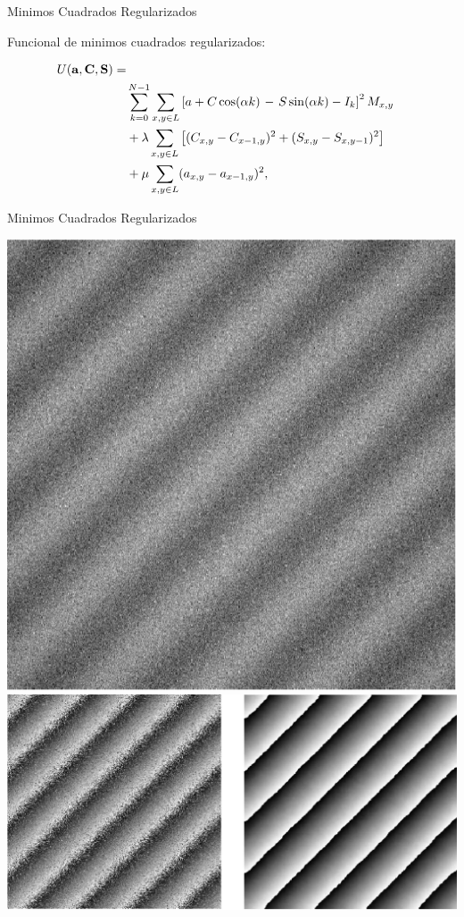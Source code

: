 \documentclass[]{beamer}
\begin{document}
\begin{frame}{Minimos Cuadrados Regularizados}
\begin{center}

Funcional de minimos cuadrados regularizados:
\begin{small}
\begin{align}
  U(\bf{a,C,S})=\nonumber\\
  &\sum_{k=0}^{N-1} \sum_{x,y\in L} \left[a + 
  C\cos(\alpha k)\right.
  -\left. S\sin(\alpha k)-I_k \right]^2 M_{x,y}\nonumber \\
  &+\lambda\sum_{x,y\in L}
  \left[(C_{x,y}-C_{x-1,y})^2+(S_{x,y}-S_{x,y-1})^2\right]
  \nonumber\\
  &+\mu\sum_{x,y\in L}(a_{x,y}-a_{x-1,y})^2,
  \label{eq:psi regularized}
\end{align}
\end{small}


\end{center}
\end{frame}
\begin{frame}{Minimos Cuadrados Regularizados}
\begin{center}

\includegraphics[scale=0.28]{Images/InterferogramLS.png}\\
\includegraphics[scale=0.28]{Images/LS-Regularized.png}

\end{center}
\end{frame}
\end{document}
